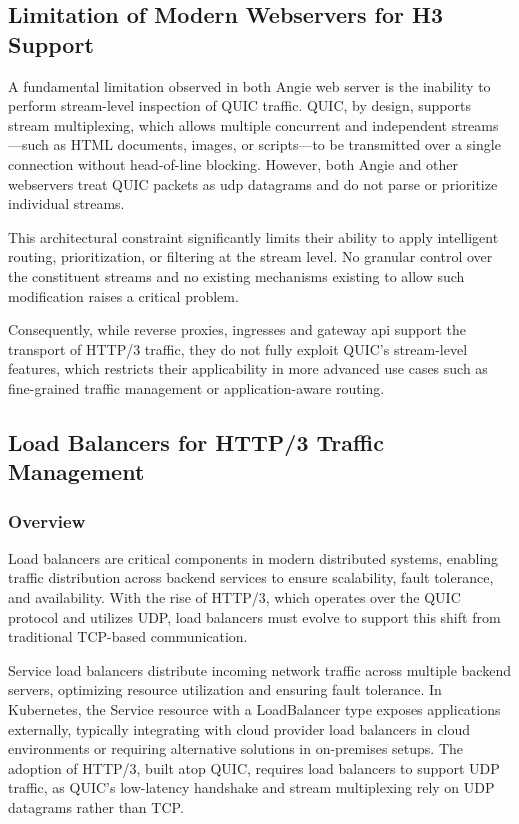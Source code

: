 \subsection{Limitation of Modern Webservers for H3 Support}
A fundamental limitation observed in both Angie web server is the inability to perform stream-level inspection of QUIC traffic. QUIC, by design, supports stream multiplexing, which allows multiple concurrent and independent streams—such as HTML documents, images, or scripts—to be transmitted over a single connection without head-of-line blocking. However, both Angie and other webservers treat QUIC packets as udp datagrams and do not parse or prioritize individual streams.

This architectural constraint significantly limits their ability to apply intelligent routing, prioritization, or filtering at the stream level. No granular control over the constituent streams and no existing mechanisms existing to allow such modification raises a critical problem. 

Consequently, while reverse proxies, ingresses and gateway api support the transport of HTTP/3 traffic, they do not fully exploit QUIC's stream-level features, which restricts their applicability in more advanced use cases such as fine-grained traffic management or application-aware routing.

\subsection{Load Balancers for HTTP/3 Traffic Management}
\subsubsection{Overview}
Load balancers are critical components in modern distributed systems, enabling traffic distribution across backend services to ensure scalability, fault tolerance, and availability. With the rise of HTTP/3, which operates over the QUIC protocol and utilizes UDP, load balancers must evolve to support this shift from traditional TCP-based communication.

Service load balancers distribute incoming network traffic across multiple backend servers, optimizing resource utilization and ensuring fault tolerance. In Kubernetes, the Service resource with a LoadBalancer type exposes applications externally, typically integrating with cloud provider load balancers in cloud environments or requiring alternative solutions in on-premises setups. The adoption of HTTP/3, built atop QUIC, requires load balancers to support UDP traffic, as QUIC's low-latency handshake and stream multiplexing rely on UDP datagrams rather than TCP.


